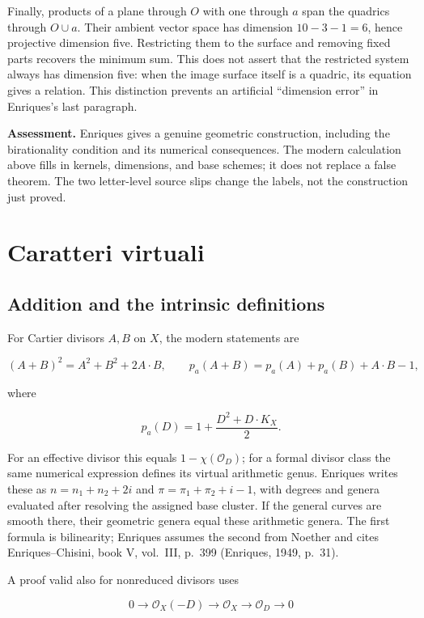 Finally, products of a plane through \(O\) with one through \(a\) span the quadrics through \(O\cup a\). Their ambient vector space has dimension \(10-3-1=6\), hence projective dimension five. Restricting them to the surface and removing fixed parts recovers the minimum sum. This does not assert that the restricted system always has dimension five: when the image surface itself is a quadric, its equation gives a relation. This distinction prevents an artificial ``dimension error'' in Enriques's last paragraph.

\textbf{Assessment.} Enriques gives a genuine geometric construction, including the birationality condition and its numerical consequences. The modern calculation above fills in kernels, dimensions, and base schemes; it does not replace a false theorem. The two letter-level source slips change the labels, not the construction just proved.

\section{Caratteri virtuali}
\label{enriques-I-10}

\subsection{Addition and the intrinsic definitions}

For Cartier divisors \(A,B\) on \(X\), the modern statements are

\[
(A+B)^2=A^2+B^2+2A\cdot B,\qquad
p_a(A+B)=p_a(A)+p_a(B)+A\cdot B-1,
\]

where

\[
p_a(D)=1+\frac{D^2+D\cdot K_X}{2}.
\]

For an effective divisor this equals \(1-\chi(\mathcal O_D)\); for a formal divisor class the same numerical expression defines its virtual arithmetic genus. Enriques writes these as \(n=n_1+n_2+2i\) and \(\pi=\pi_1+\pi_2+i-1\), with degrees and genera evaluated after resolving the assigned base cluster. If the general curves are smooth there, their geometric genera equal these arithmetic genera. The first formula is bilinearity; Enriques assumes the second from Noether and cites Enriques--Chisini, book V, vol.~III, p.~399 (Enriques, 1949, p.~31).

A proof valid also for nonreduced divisors uses

\[
0\longrightarrow\mathcal O_X(-D)\longrightarrow\mathcal O_X
\longrightarrow\mathcal O_D\longrightarrow0
\]

